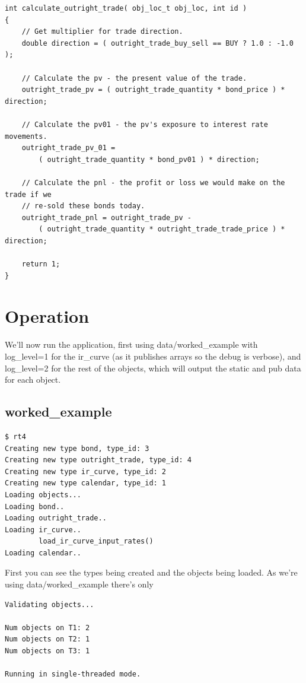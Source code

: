 \documentclass{report}
\begin{document}
\begin{verbatim}
int calculate_outright_trade( obj_loc_t obj_loc, int id )
{
    // Get multiplier for trade direction.
    double direction = ( outright_trade_buy_sell == BUY ? 1.0 : -1.0 );

    // Calculate the pv - the present value of the trade.
    outright_trade_pv = ( outright_trade_quantity * bond_price ) * direction;

    // Calculate the pv01 - the pv's exposure to interest rate movements.
    outright_trade_pv_01 = 
        ( outright_trade_quantity * bond_pv01 ) * direction;

    // Calculate the pnl - the profit or loss we would make on the trade if we 
    // re-sold these bonds today.
    outright_trade_pnl = outright_trade_pv - 
        ( outright_trade_quantity * outright_trade_trade_price ) * direction;

    return 1;
}
\end{verbatim}

\section{Operation}

We'll now run the application, first using data/worked_example with log_level=1 for the ir_curve (as it publishes arrays so the debug is verbose), and log_level=2 for the rest of the objects, which will output the static and pub data for each object.

\subsection{worked_example}
 
\begin{verbatim}
$ rt4
Creating new type bond, type_id: 3
Creating new type outright_trade, type_id: 4
Creating new type ir_curve, type_id: 2
Creating new type calendar, type_id: 1
Loading objects...
Loading bond..
Loading outright_trade..
Loading ir_curve..
        load_ir_curve_input_rates()
Loading calendar..

\end{verbatim}

First you can see the types being created and the objects being loaded. As we're using data/worked_example there's only

\begin{verbatim}
Validating objects...

Num objects on T1: 2
Num objects on T2: 1
Num objects on T3: 1

Running in single-threaded mode.
\end{verbatim}
\end{document}
